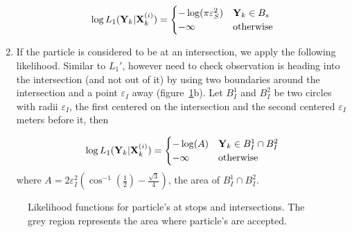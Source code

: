 \documentclass[draftcls,a4paper,onecolumn]{IEEEtran}\usepackage[]{graphicx}\usepackage[]{color}
\newenvironment{knitrout}{}{} %
\begin{document}
\begin{enumerate}
\begin{equation}
  \label{eq:l1b}
  \log L_1(\mathbf{Y}_k | \mathbf{X}_k^{(i)})=
  \begin{cases}
    - \log(\pi \varepsilon_S^2) & \mathbf{Y}_k \in B_s \\
    - \infty & \text{otherwise}
  \end{cases}
\end{equation}

\item
If the particle is considered to be at an intersection, we apply the following likelihood.
Similar to $L_1'$, however need to check observation is heading into the intersection
(and not out of it) by using two boundaries around the intersection and a point $\varepsilon_I$ away
(figure~\ref{fig:likelihood_circles}b).
Let $B_I^1$ and $B_I^2$ be two circles with radii $\varepsilon_I$,
the first centered on the intersection and the second centered $\varepsilon_I$ meters before it, then

\begin{equation}
  \label{eq:l1c}
  \log L_1 (\mathbf{Y}_k | \mathbf{X}_k^{(i)}) =
  \begin{cases}
    - \log(A) & \mathbf{Y}_k \in B_I^1 \cap B_I^2 \\
    - \infty & \text{otherwise}
  \end{cases}
\end{equation}
where $A = 2\varepsilon_I^2 \left( \cos^{-1}(\frac{1}{2}) - \frac{\sqrt{3}}{4} \right)$,
the area of $B_I^1\cap B_I^2$.

\end{enumerate}


\begin{knitrout}
\color{fgcolor}\begin{figure}
\caption[Likelihood functions for particle's at stops and intersections]{Likelihood functions for particle's at stops and intersections. The grey region represents the area where particle's are accepted.}\label{fig:likelihood_circles}
\end{figure}


\end{knitrout}
\end{document}
